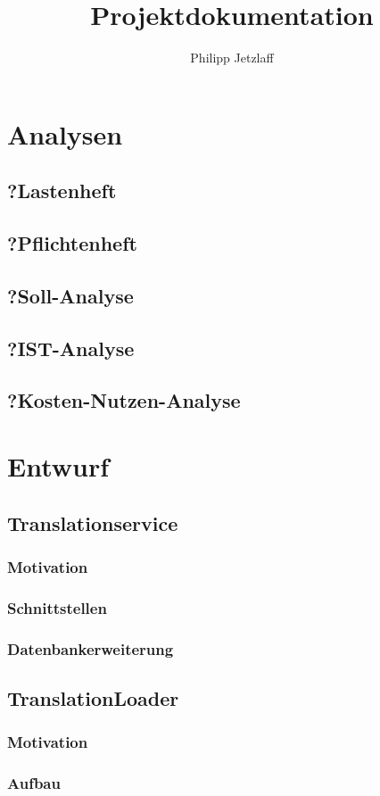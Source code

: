 \documentclass[12pt,a4paper,oneside]{article}
\author{Philipp Jetzlaff}
\title{Projektdokumentation}
\begin{document}
    \tableofcontents
    \section{Analysen}
    \subsection{?Lastenheft}
    \subsection{?Pflichtenheft}
    \subsection{?Soll-Analyse}
    \subsection{?IST-Analyse}
    \subsection{?Kosten-Nutzen-Analyse}
    \section{Entwurf}
    \subsection{Translationservice}
    \subsubsection{Motivation}
    \subsubsection{Schnittstellen}
    \subsubsection{Datenbankerweiterung}
    \subsection{TranslationLoader}
    \subsubsection{Motivation}
    \subsubsection{Aufbau}
\end{document}
